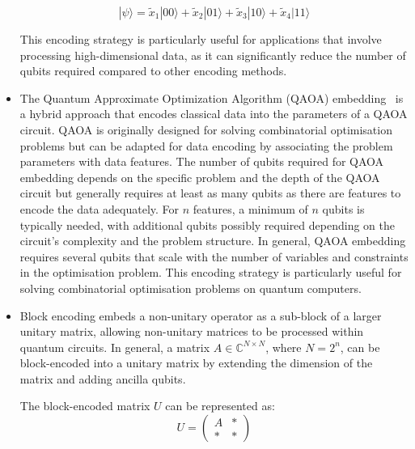 \begin{itemize}
    \begin{equation}
      |\psi \rangle = \tilde{x}_1 |00\rangle + \tilde{x}_2 |01\rangle
      + \tilde{x}_3 |10\rangle + \tilde{x}_4 |11\rangle
    \end{equation}

    This encoding strategy is particularly useful for applications
    that involve processing high-dimensional data, as it can
    significantly reduce the number of qubits required compared to
    other encoding methods.
  \item The Quantum Approximate Optimization Algorithm (QAOA)
    embedding~\cite{lloyd2020quantum} is a hybrid approach that
    encodes classical data into the parameters of a QAOA circuit.
    QAOA is originally designed for solving combinatorial
    optimisation problems but can be adapted for data encoding by
    associating the problem parameters with data features. The number
    of qubits required for QAOA embedding depends on the specific
    problem and the depth of the QAOA circuit but generally requires
    at least as many qubits as there are features to encode the data
    adequately. For \(n\) features, a minimum of \(n\) qubits is
    typically needed, with additional qubits possibly required
    depending on the circuit's complexity and the problem structure.
    In general, QAOA embedding requires several qubits that scale
    with the number of variables and constraints in the optimisation
    problem. This encoding strategy is particularly useful for
    solving combinatorial optimisation problems on quantum computers.
  \item Block encoding embeds a non-unitary operator as a sub-block
    of a larger unitary matrix,
    allowing non-unitary matrices to be processed within quantum circuits.
    In general, a matrix \( A \in \mathbb{C}^{N \times N} \), where
    \( N = 2^n \), can be block-encoded into a unitary matrix by
    extending the dimension of the matrix and adding ancilla qubits.

    The block-encoded matrix \( U \) can be represented as:
    \begin{equation}
      U =
      \begin{pmatrix}
        A & * \\
        * & *
      \end{pmatrix}
    \end{equation}


\end{itemize}
